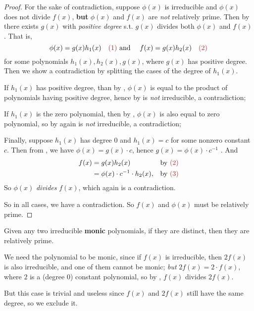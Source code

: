 \begin{proof}
For the sake of contradiction, suppose \(\phi(x)\) is irreducible and \(\phi(x)\) does not divide \(f(x)\),
\textbf{but} \(\phi(x)\) and \(f(x)\) are \emph{not} relatively prime.
Then by  there exists \(g(x)\) with \emph{positive degree} s.t. \(g(x)\) divides both \(\phi(x)\) and \(f(x)\).
That is,
\[
    \phi(x) = g(x)h_1(x) \quad \MAROON{(1)} \text{ and } \quad f(x) = g(x)h_2(x) \quad \MAROON{(2)}
\]
for some polynomials \(h_1(x), h_2(x), g(x)\), where \(g(x)\) has positive degree.
Then we show a contradiction by splitting the cases of the degree of \(h_1(x)\).

If \(h_1(x)\) has positive degree, than by , \(\phi(x)\) is equal to the product of polynomials having positive degree, hence by  is \emph{not} irreducible, a contradiction;

If \(h_1(x)\) is the zero polynomial, then by , \(\phi(x)\) is also equal to zero polynomial, so by  again is \emph{not} irreducible, a contradiction;

Finally, suppose \(h_1(x)\) has degree \(0\) and \(h_1(x) = c\) for some nonzero constant \(c\).
Then from , we have \(\phi(x) = g(x) \cdot c\), hence \(g(x) = \phi(x) \cdot c^{-1}\) \quad {}.
And
\begin{align*}
    f(x) & = g(x)h_2(x) & \text{by \MAROON{(2)}} \\
         & = \phi(x) \cdot c^{-1} \cdot h_2(x), & \text{by \MAROON{(3)}}
\end{align*}
So \(\phi(x)\) \emph{divides} \(f(x)\), which again is a contradiction.

So in all cases, we have a contradiction.
So \(f(x)\) and \(\phi(x)\) must be relatively prime.
\end{proof}

\begin{appendix theorem} \label{thm e.7}
Given any two irreducible \textbf{monic} polynomials, if they are distinct, then they are relatively prime.
\end{appendix theorem}

\begin{note}
We need the polynomial to be monic, since if \(f(x)\) is irreducible, then \(2f(x)\) is also irreducible, and one of them cannot be monic;
\emph{but} \(2f(x) = 2 \cdot f(x)\), where \(2\) is a (degree \(0\)) constant polynomial, so by , \(f(x)\) divides \(2f(x)\).

But this case is trivial and useless since \(f(x)\) and \(2f(x)\) still have the same degree, so we exclude it.
\end{note}

